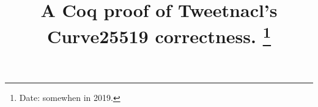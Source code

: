 \documentclass[conference, 9pt]{IEEEtran}
\newif\ifpublic
\begin{document}
\date{}

\title{\Large \bf A Coq proof of Tweetnacl's Curve25519 correctness.%
\thanks{
Date: somewhen in 2019.}
}

\ifpublic
\author{
\IEEEauthorblockN{Peter Schwabe}
\IEEEauthorblockA{Radboud University,\\
The Netherlands}
\and
\IEEEauthorblockN{Beno\^it Viguier}
\IEEEauthorblockA{Radboud University,\\
The Netherlands}
\and
\IEEEauthorblockN{Timmy Weerwag}
\IEEEauthorblockA{Radboud University,\\
The Netherlands}
\and
\IEEEauthorblockN{Freek Wiedijk}
\IEEEauthorblockA{Radboud University,\\
The Netherlands}
}
\fi

\maketitle










\vspace*{1cm}
{\footnotesize 
}

\begin{appendix}
\end{appendix}

\listoftodos
\end{document}
